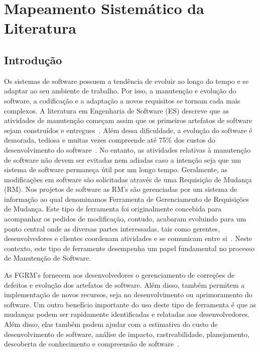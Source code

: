 
\chapter{Mapeamento Sistemático da Literatura}
\label{ch:mapeamento-sistematico}

\section{Introdução}
\label{sec:map-intro}

Os sistemas de software possuem a tendência de evoluir ao longo do tempo e se
adaptar ao seu ambiente de trabalho. Por isso, a manutenção e evolução do
software, a codificação e a adaptação a novos requisitos se tornam cada mais
complexos. A literatura em Engenharia de Software (ES) descreve que as
atividades de manutenção começam assim que os primeiros artefatos de software
sejam construídos e entregues~\cite{pigoski1996practical}. Além dessa
dificuldade, a evolução do software é demorada, tediosa e muitas vezes
compreende até 75\% dos custos do desenvolvimento do
software~\cite{liu2012schedule}.  No entanto, as atividades relativas à
manutenção de software não devem ser evitadas nem adiadas caso a intenção seja
que um sistema de software permaneça útil por um longo tempo.  Geralmente, as
modificações em software são solicitadas através de uma Requisição de Mudança
(RM). Nos projetos de software as RM's são gerenciadas por um sistema de
informação ao qual denominamos Ferramenta de Gerenciamento de Requisições de
Mudança. Este tipo de ferramenta foi originalmente concebida para acompanhar os
pedidos de modificação, contudo, acabaram evoluindo para um ponto central onde
as diversas partes interessadas, tais como gerentes, desenvolvedores e clientes
coordenam atividades e se comunicam entre si~\cite{bertram2010communication}.
Neste contexto, este tipo de ferramente desempenha um papel fundamental no
processo de Manutenção de Software.

As FGRM's fornecem aos desenvolvedores o gerenciamento de correções de defeitos
e evolução dos artefatos de software. Além disso, também permitem a
implementação de novos recursos, seja no desenvolvimento ou aprimoramento do
software. Um outro benefício importante do uso deste tipo de ferramenta é que as
mudanças podem ser rapidamente identificadas e relatadas aos desenvolvedores.
Além disso, elas também podem ajudar com a estimativa do custo de
desenvolvimento de software, análise de impacto, rastreabilidade, planejamento,
descoberta de conhecimento e compreensão de software~\cite{cavalcanti2013bug}.

